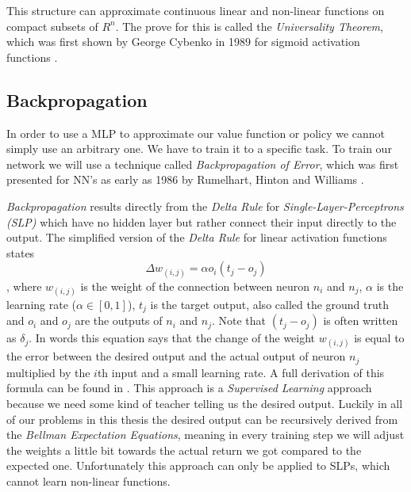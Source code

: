 This structure can approximate continuous linear and non-linear functions on compact subsets of $R^n$. The prove for this is called the \emph{Universality Theorem}, which was first shown by George Cybenko in 1989 for sigmoid activation functions \cite{universality_proof}.


\subsection{Backpropagation}

In order to use a MLP to approximate our value function or policy we cannot simply use an arbitrary one. We have to train it to a specific task.
To train our network we will use a technique called \emph{Backpropagation of Error}, which was first presented for NN's as early as 1986 by Rumelhart, Hinton and Williams \cite{backprop}.

\emph{Backpropagation} results directly from the \emph{Delta Rule} for \emph{Single-Layer-Perceptrons (SLP)} which have no hidden layer but rather connect their input directly to the output.
The simplified version of the \emph{Delta Rule} for linear activation functions states
\begin{equation} \label{eq:td_v}
	\Delta w_{(i,j)} = \alpha o_i(t_j - o_j)
\end{equation},
where $w_{(i,j)}$ is the weight of the connection between neuron $n_i$ and $n_j$,
$\alpha$ is the learning rate ($\alpha \in [0,1]$),
$t_j$ is the target output, also called the ground truth and
$o_i$ and $o_j$ are the outputs of $n_i$ and $n_j$.
Note that $(t_j - o_j)$ is often written as $\delta_j$.
In words this equation says that the change of the weight $w_(i,j)$ is equal to the error between the desired output and the actual output of neuron $n_j$ multiplied by the $i$th input and a small learning rate.
A full derivation of this formula can be found in \cite{delta_rule}.
This approach is a \emph{Supervised Learning} approach because we need some kind of teacher telling us the desired output.
Luckily in all of our problems in this thesis the desired output can be recursively derived from the \emph{Bellman Expectation Equations}, meaning in every training step we will adjust the weights a little bit towards the actual return we got compared to the expected one.
Unfortunately this approach can only be applied to SLPs, which cannot learn non-linear functions.

